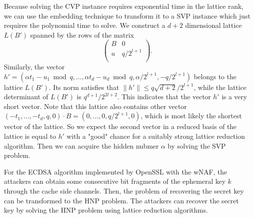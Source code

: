 Because solving the CVP instance requires exponential time in the lattice rank,
 we can use the embedding technique \cite{Nguyen1999} to transform it to a SVP instance which just requires the polynomial time to solve.
We construct a $d+2$ dimensional lattice $L(B')$ spanned by the rows of the matrix
$$
\left(
  \begin{array}{cc}
    B & 0 \\
    u & q/2^{l+1} \\
  \end{array}
\right).
$$
Similarly, the vector $h' = (\alpha t_1 - u_1 \bmod q, ..., \alpha t_d - u_d \bmod q, \alpha /2^{l+1}, -q/2^{l+1})$ belongs to the lattice $L(B')$.
 Its norm satisfies that $\|h'\| \leq q\sqrt{d+2}/2^{l+1}$,
  while the lattice determinant of $L(B')$ is $q^{d+1}/2^{2l+2}$.
   This indicates that the vector $h'$ is a very short vector.
Note that this lattice also contains other vector $(-t_1, ..., -t_d, q, 0)\cdot B = (0, ..., 0, q/2^{l+1}, 0)$,
 which is most likely the shortest vector of the lattice.
So we expect the second vector in a reduced basis of the lattice is equal to $h'$ with a "good" chance for a suitably strong lattice reduction algorithm.
Then we can acquire the hidden nubmer $\alpha$ by solving the SVP problem.


For the ECDSA algorithm implemented by OpenSSL with the wNAF,
  the attackers can obtain some consecutive bit fragments of the ephemeral key $k$ through the cache side channels.
Then, the problem of recovering the secret key can be transformed to the HNP problem.
 The attackers can recover the secret key by solving the HNP problem using lattice reduction algorithms.






